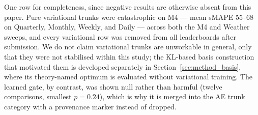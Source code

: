 One row for completeness, since negative results are otherwise absent from
this paper. Pure variational trunks were catastrophic on M4 --- mean sMAPE
55--68 on Quarterly, Monthly, Weekly, and Daily --- across both the M4 and
Weather sweeps, and every variational row was removed from all leaderboards
after submission. We do not claim variational trunks are unworkable in
general, only that they were not stabilised within this study; the KL-based
basis construction that motivated them is developed separately in
Section~\ref{sec:method_basis}, where its theory-named optimum is evaluated
without variational training. The learned gate, by contrast, was shown null
rather than harmful (twelve comparisons, smallest $p = 0.24$), which is why
it is merged into the AE trunk category with a provenance marker instead of
dropped.


